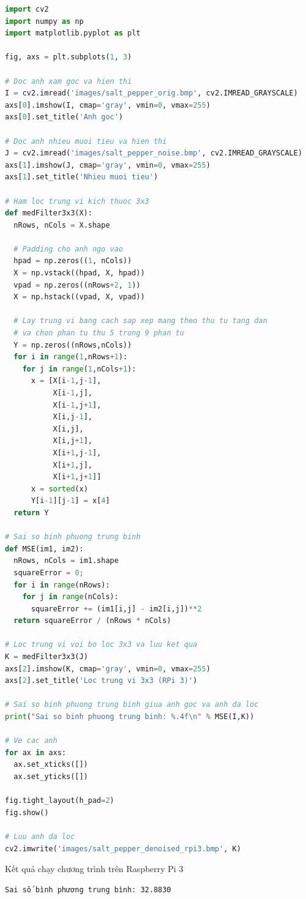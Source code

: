 \begin{lstlisting}[language=Python]
import cv2
import numpy as np
import matplotlib.pyplot as plt

fig, axs = plt.subplots(1, 3)

# Doc anh xam goc va hien thi
I = cv2.imread('images/salt_pepper_orig.bmp', cv2.IMREAD_GRAYSCALE)
axs[0].imshow(I, cmap='gray', vmin=0, vmax=255)
axs[0].set_title('Anh goc')

# Doc anh nhieu muoi tieu va hien thi
J = cv2.imread('images/salt_pepper_noise.bmp', cv2.IMREAD_GRAYSCALE)
axs[1].imshow(J, cmap='gray', vmin=0, vmax=255)
axs[1].set_title('Nhieu muoi tieu')

# Ham loc trung vi kich thuoc 3x3
def medFilter3x3(X):
  nRows, nCols = X.shape

  # Padding cho anh ngo vao
  hpad = np.zeros((1, nCols))
  X = np.vstack((hpad, X, hpad))
  vpad = np.zeros((nRows+2, 1))
  X = np.hstack((vpad, X, vpad))

  # Lay trung vi bang cach sap xep mang theo thu tu tang dan
  # va chon phan tu thu 5 trong 9 phan tu
  Y = np.zeros((nRows,nCols))
  for i in range(1,nRows+1):
    for j in range(1,nCols+1):
      x = [X[i-1,j-1],
           X[i-1,j],
           X[i-1,j+1],
           X[i,j-1],
           X[i,j],
           X[i,j+1],
           X[i+1,j-1],
           X[i+1,j],
           X[i+1,j+1]]
      x = sorted(x)
      Y[i-1][j-1] = x[4]
  return Y

# Sai so binh phuong trung binh
def MSE(im1, im2):
  nRows, nCols = im1.shape
  squareError = 0;
  for i in range(nRows):
    for j in range(nCols):
      squareError += (im1[i,j] - im2[i,j])**2
  return squareError / (nRows * nCols)

# Loc trung vi voi bo loc 3x3 va luu ket qua
K = medFilter3x3(J)
axs[2].imshow(K, cmap='gray', vmin=0, vmax=255)
axs[2].set_title('Loc trung vi 3x3 (RPi 3)')

# Sai so binh phuong trung binh giua anh goc va anh da loc
print("Sai so binh phuong trung binh: %.4f\n" % MSE(I,K))

# Ve cac anh
for ax in axs:
  ax.set_xticks([])
  ax.set_yticks([])

fig.tight_layout(h_pad=2)
fig.show()

# Luu anh da loc
cv2.imwrite('images/salt_pepper_denoised_rpi3.bmp', K)
\end{lstlisting}

Kết quả chạy chương trình trên Raspberry Pi 3

\begin{verbatim}
Sai số bình phương trung bình: 32.8830
\end{verbatim}


